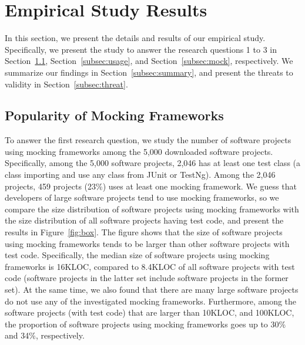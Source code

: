 \section{Empirical Study Results}
\label{sec:study}
\vspace{-0.2cm}

In this section, we present the details and results of our empirical study. Specifically, we present the study to answer the research questions 1 to 3 in Section~\ref{subsec:pop}, Section~\ref{subsec:usage}, and Section~\ref{subsec:mock}, respectively. We summarize our findings in Section~\ref{subsec:summary}, and present the threats to validity in Section~\ref{subsec:threat}. 
\vspace{-0.2cm}
\subsection{Popularity of Mocking Frameworks}
\label{subsec:pop}
\vspace{-0.2cm}

To answer the first research question, we study the number of software projects using mocking frameworks among the 5,000 downloaded software projects. Specifically, among the 5,000 software projects, 2,046 has at least one test class (a class importing and use any class from JUnit or TestNg). Among the 2,046 projects, 459 projects (23\%) uses at least one mocking framework. We guess that developers of large software projects tend to use mocking frameworks, so we compare the size distribution of software projects using mocking frameworks with the size distribution of all software projects having test code, and present the results in Figure~\ref{fig:box}. The figure shows that the size of software projects using mocking frameworks tends to be larger than other software projects with test code. Specifically, the median size of software projects using mocking frameworks is 16KLOC,  compared to 8.4KLOC of all software projects with test code (software projects in the latter set include software projects in the former set). At the same time, we also found that there are many large software projects do not use any of the investigated mocking frameworks. Furthermore, among the software projects (with test code) that are larger than 10KLOC, and 100KLOC, the proportion of software projects using mocking frameworks goes up to 30\% and 34\%, respectively. 

